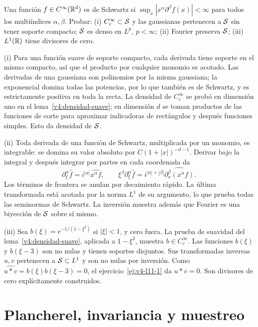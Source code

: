 \begin{ejercicio}\label{ej:v4-l11-5}
Una función $f\in C^\infty(\mathbb R^d)$ es de Schwartz si $\sup_x|x^\alpha\partial^\beta f(x)|<\infty$ para todos los multiíndices $\alpha,\beta$. Probar: (i) $C_c^\infty\subset\mathcal S$ y las gaussianas pertenecen a $\mathcal S$ sin tener soporte compacto; $\mathcal S$ es denso en $L^p$, $p<\infty$; (ii) Fourier preserva $\mathcal S$; (iii) $L^1(\mathbb R)$ tiene divisores de cero.
\end{ejercicio}
\begin{solucion}
(i) Para una función suave de soporte compacto, cada derivada tiene soporte en el mismo compacto, así que el producto por cualquier monomio es acotado. Las derivadas de una gaussiana son polinomios por la misma gaussiana; la exponencial domina todas las potencias, por lo que también es de Schwartz, y es estrictamente positiva en toda la recta. La densidad de $C_c^\infty$ se probó en dimensión uno en el lema~\ref{v4:densidad-suave}; en dimensión $d$ se toman productos de las funciones de corte para aproximar indicadoras de rectángulos y después funciones simples. Esto da densidad de $\mathcal S$.

(ii) Toda derivada de una función de Schwartz, multiplicada por un monomio, es integrable: se domina su valor absoluto por $C(1+|x|)^{-d-1}$. Derivar bajo la integral y después integrar por partes en cada coordenada da
\[
 \partial_\xi^\alpha\widehat f=i^{|\alpha|}\widehat{x^\alpha f},\qquad
 \xi^\beta\partial_\xi^\alpha\widehat f
 =i^{|\alpha|+|\beta|}\widehat{\partial_x^\beta(x^\alpha f)}.
\]
Los términos de frontera se anulan por decaimiento rápido. La última transformada está acotada por la norma $L^1$ de su argumento, lo que prueba todas las seminormas de Schwartz. La inversión muestra además que Fourier es una biyección de $\mathcal S$ sobre sí mismo.

(iii) Sea $b(\xi)=e^{-1/(1-\xi^2)}$ si $|\xi|<1$, y cero fuera. La prueba de suavidad del lema~\ref{v4:densidad-suave}, aplicada a $1-\xi^2$, muestra $b\in C_c^\infty$. Las funciones $b(\xi)$ y $b(\xi-3)$ son no nulas y tienen soportes disjuntos. Sus transformadas inversas $u,v$ pertenecen a $\mathcal S\subset L^1$ y son no nulas por inversión. Como $\widehat{u*v}=b(\xi)b(\xi-3)=0$, el ejercicio~\ref{ej:v4-l11-1} da $u*v=0$. Son divisores de cero explícitamente construidos.
\end{solucion}

\chapter{Plancherel, invariancia y muestreo}


